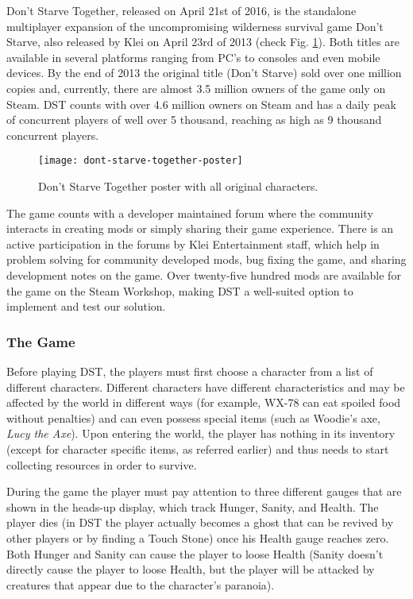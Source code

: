 Don't Starve Together, released on April 21st of 2016, is the standalone multiplayer expansion of the uncompromising wilderness survival game Don't Starve, also released by Klei on April 23rd of 2013 (check Fig. \ref{fig:don't-starve-together-poster}).
Both titles are available in several platforms ranging from PC's to consoles and even mobile devices.
By the end of 2013 the original title (Don't Starve) sold over one million copies and, currently, there are almost 3.5 million owners of the game only on Steam.
\ac{DST} counts with over 4.6 million owners on Steam and has a daily peak of concurrent players of well over 5 thousand, reaching as high as 9 thousand concurrent players.

\begin{figure}
  \centering
    \texttt{[image: dont-starve-together-poster]}
  \caption{Don't Starve Together poster with all original characters.}
  \label{fig:don't-starve-together-poster}
\end{figure}

The game counts with a developer maintained forum where the community interacts in creating mods or simply sharing their game experience.
There is an active participation in the forums by Klei Entertainment staff, which help in problem solving for community developed mods, bug fixing the game, and sharing development notes on the game.
Over twenty-five hundred mods are available for the game on the Steam Workshop, making \ac{DST} a well-suited option to implement and test our solution.

\subsubsection{The Game}
Before playing \ac{DST}, the players must first choose a character from a list of different characters.
Different characters have different characteristics and may be affected by the world in different ways (for example, WX-78 can eat spoiled food without penalties) and can even possess special items (such as Woodie's axe, \textit{Lucy the Axe}).
Upon entering the world, the player has nothing in its inventory (except for character specific items, as referred earlier) and thus needs to start collecting resources in order to survive.

During the game the player must pay attention to three different gauges that are shown in the heads-up display, which track Hunger, Sanity, and Health.
The player dies (in \ac{DST} the player actually becomes a ghost that can be revived by other players or by finding a Touch Stone) once his Health gauge reaches zero.
Both Hunger and Sanity can cause the player to loose Health (Sanity doesn't directly cause the player to loose Health, but the player will be attacked by creatures that appear due to the character's paranoia).

